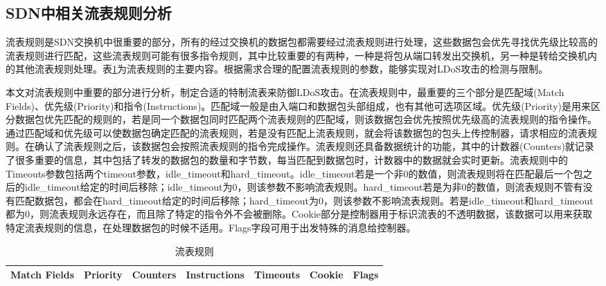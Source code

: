 \subsection{SDN中相关流表规则分析}
\label{chap4:flowruleanalysis}

流表规则是SDN交换机中很重要的部分，所有的经过交换机的数据包都需要经过流表规则进行处理，这些数据包会优先寻找优先级比较高的流表规则进行匹配，这些流表规则可能有很多指令规则，其中比较重要的有两种，一种是将包从端口转发出交换机，另一种是转给交换机内的其他流表规则处理。表\ref{table:flowrule}为流表规则的主要内容。根据需求合理的配置流表规则的参数，能够实现对LDoS攻击的检测与限制。

本文对流表规则中重要的部分进行分析，制定合适的特制流表来防御LDoS攻击。在流表规则中，最重要的三个部分是匹配域(Match Fields)、优先级(Priority)和指令(Instructions)。匹配域一般是由入端口和数据包头部组成，也有其他可选项区域。优先级(Priority)是用来区分数据包优先匹配的规则的，若是同一个数据包同时匹配两个流表规则的匹配域，则该数据包会优先按照优先级高的流表规则的指令操作。通过匹配域和优先级可以使数据包确定匹配的流表规则，若是没有匹配上流表规则，就会将该数据包的包头上传控制器，请求相应的流表规则。在确认了流表规则之后，该数据包会按照流表规则的指令完成操作。流表规则还具备数据统计的功能，其中的计数器(Counters)就记录了很多重要的信息，其中包括了转发的数据包的数量和字节数，每当匹配到数据包时，计数器中的数据就会实时更新。流表规则中的Timeouts参数包括两个timeout参数，idle\_timeout和hard\_timeout。idle\_timeout若是一个非0的数值，则流表规则将在匹配最后一个包之后的idle\_timeout给定的时间后移除；idle\_timeout为0，则该参数不影响流表规则。hard\_timeout若是为非0的数值，则流表规则不管有没有匹配数据包，都会在hard\_timeout给定的时间后移除；hard\_timeout为0，则该参数不影响流表规则。若是idle\_timeout和hard\_timeout都为0，则流表规则永远存在，而且除了特定的指令外不会被删除。Cookie部分是控制器用于标识流表的不透明数据，该数据可以用来获取特定流表规则的信息，在处理数据包的时候不适用。Flags字段可用于出发特殊的消息给控制器。


\begin{table}[htbp]
	\centering  %
	\caption{流表规则}  %
	\label{table:flowrule}  %
	\begin{tabular}{|c|c|c|c|c|c|c|}  
		\hline  %
        Match Fields & Priority & Counters & Instructions & Timeouts & Cookie & Flags \\  %
        \hline
		
	\end{tabular}
\end{table}

